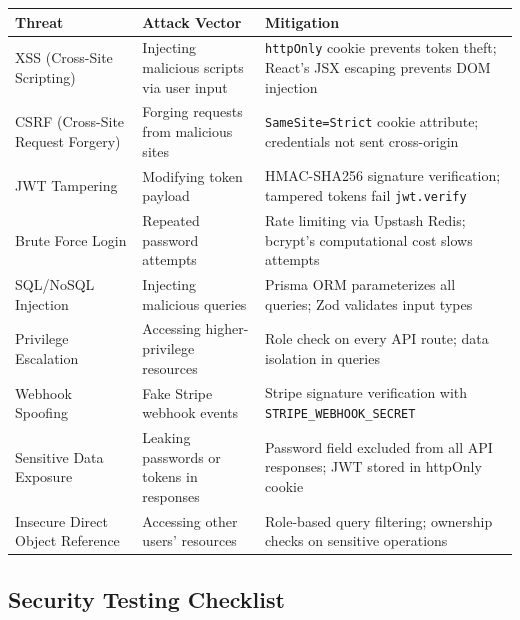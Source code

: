 \documentclass[12pt,onecolumn]{IEEEtran}
\begin{document}
\begin{center}
\begin{longtable}{lp{4cm}p{5cm}}
  \toprule
  \textbf{Threat} & \textbf{Attack Vector} & \textbf{Mitigation} \\
  \midrule
  \endhead
  XSS (Cross-Site Scripting) & Injecting malicious scripts via user input & \texttt{httpOnly} cookie prevents token theft; React's JSX escaping prevents DOM injection \\
  CSRF (Cross-Site Request Forgery) & Forging requests from malicious sites & \texttt{SameSite=Strict} cookie attribute; credentials not sent cross-origin \\
  JWT Tampering & Modifying token payload & HMAC-SHA256 signature verification; tampered tokens fail \texttt{jwt.verify} \\
  Brute Force Login & Repeated password attempts & Rate limiting via Upstash Redis; bcrypt's computational cost slows attempts \\
  SQL/NoSQL Injection & Injecting malicious queries & Prisma ORM parameterizes all queries; Zod validates input types \\
  Privilege Escalation & Accessing higher-privilege resources & Role check on every API route; data isolation in queries \\
  Webhook Spoofing & Fake Stripe webhook events & Stripe signature verification with \texttt{STRIPE\_WEBHOOK\_SECRET} \\
  Sensitive Data Exposure & Leaking passwords or tokens in responses & Password field excluded from all API responses; JWT stored in httpOnly cookie \\
  Insecure Direct Object Reference & Accessing other users' resources & Role-based query filtering; ownership checks on sensitive operations \\
  \bottomrule
\end{longtable}
\end{center}

\subsection{Security Testing Checklist}
\end{document}

